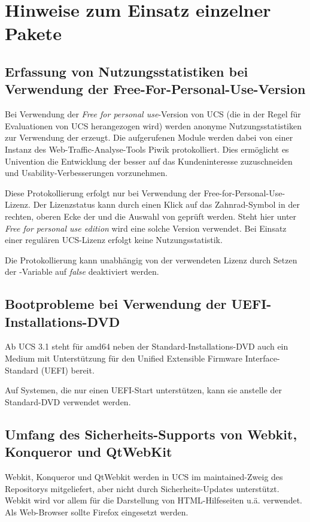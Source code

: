 \chapter{Hinweise zum Einsatz einzelner Pakete}

\section{Erfassung von Nutzungsstatistiken bei Verwendung der Free-For-Personal-Use-Version}
Bei Verwendung der  \emph{Free for personal use}-Version
von UCS (die in der Regel für Evaluationen von UCS herangezogen wird)
werden anonyme Nutzungsstatistiken zur Verwendung der \ucsUMC{}
erzeugt. Die aufgerufenen Module werden dabei von einer Instanz des
Web-Traffic-Analyse-Tools Piwik protokolliert. Dies ermöglicht es
Univention die Entwicklung der \ucsUMC{} besser auf das
Kundeninteresse zuzuschneiden und Usability-Verbesserungen vorzunehmen.

Diese Protokollierung erfolgt nur bei Verwendung der 
Free-for-Personal-Use-Lizenz. Der Lizenzstatus kann durch einen
Klick auf das Zahnrad-Symbol in der rechten, oberen Ecke der \ucsUMC{}
und die Auswahl von  geprüft werden. Steht hier
unter  \emph{Free for personal use edition}
wird eine solche Version verwendet. Bei Einsatz einer regulären
UCS-Lizenz erfolgt keine Nutzungsstatistik.

Die Protokollierung kann unabhängig von der verwendeten Lizenz durch
Setzen der \ucsUCR{}-Variable   auf \emph{false} deaktiviert
werden.

\section{Bootprobleme bei Verwendung der UEFI-Installations-DVD}
Ab UCS 3.1 steht für amd64 neben der Standard-Installations-DVD auch
ein Medium mit Unterstützung für den Unified Extensible Firmware
Interface-Standard (UEFI) bereit.

Auf Systemen, die nur einen UEFI-Start unterstützen, kann sie anstelle
der Standard-DVD verwendet werden.

\section{Umfang des Sicherheits-Supports von Webkit, Konqueror und QtWebKit}
Webkit, Konqueror und QtWebkit werden in UCS im maintained-Zweig des
Repositorys mitgeliefert, aber nicht durch Sicherheits-Updates
unterstützt. Webkit wird vor allem für die Darstellung von
HTML-Hilfeseiten u.ä. verwendet. Als Web-Browser sollte Firefox
eingesetzt werden.

